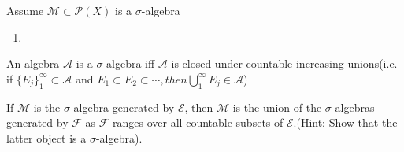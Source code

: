 \begin{mdframed}[backgroundcolor=gray!10,linewidth=0pt]
    \begin{pf} Assume $\mathcal{M}\subset \mathcal{P}(X)$ is a $\sigma$-algebra
        \begin{enumerate}[itemindent=2em]
            \item 
        \end{enumerate}
    \end{pf}
\end{mdframed}

\begin{question}
    An algebra $\mathcal{A}$ is a $\sigma$-algebra iff $\mathcal{A}$ is closed under countable increasing unions(i.e. if $\{E_j\}^\infty_1\subset \mathcal{A}$ and $E_1\subset E_2\subset \cdots, then \bigcup^\infty_1E_j\in\mathcal{A}$)
\end{question}

\begin{mdframed}[backgroundcolor=gray!10,linewidth=0pt]
    \begin{pf} 
    \end{pf}
\end{mdframed}

\begin{question}
    If $\mathcal{M}$ is the $\sigma$-algebra generated by $\mathcal{E}$, then $\mathcal{M}$ is the union of the $\sigma$-algebras generated by $\mathcal{F}$ as $\mathcal{F}$ ranges over all countable subsets of $\mathcal{E}$.(Hint: Show that the latter object is a $\sigma$-algebra).
\end{question}

\begin{mdframed}[backgroundcolor=gray!10,linewidth=0pt]
    \begin{pf} 
    \end{pf}
\end{mdframed}
